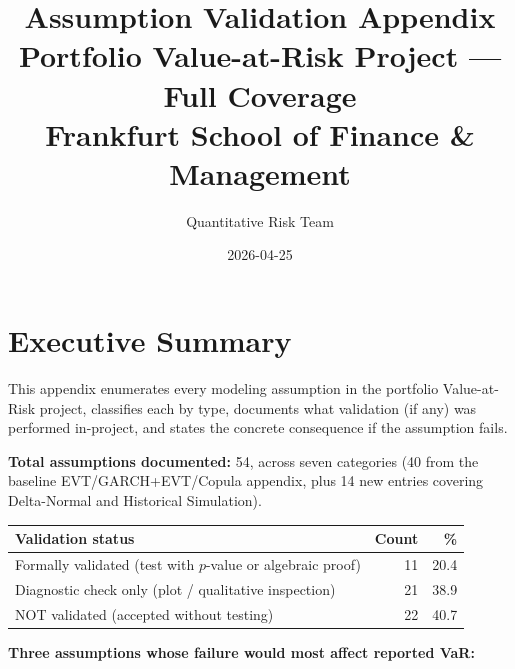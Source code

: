 \documentclass[11pt,a4paper]{article}
\title{Assumption Validation Appendix\\[0.5em]
\large Portfolio Value-at-Risk Project --- Full Coverage\\
\normalsize Frankfurt School of Finance \& Management}
\author{Quantitative Risk Team}
\date{2026-04-25}
\begin{document}
\maketitle
\tableofcontents
\newpage

\section{Executive Summary}\label{sec:executive-summary}

This appendix enumerates every modeling assumption in the portfolio
Value-at-Risk project, classifies each by type, documents what validation
(if any) was performed in-project, and states the concrete consequence if
the assumption fails.

\medskip
\noindent\textbf{Total assumptions documented:} 54, across seven categories
(40 from the baseline EVT/GARCH+EVT/Copula appendix, plus 14 new entries
covering Delta-Normal and Historical Simulation).

\medskip
\begin{tabular}{@{}lrr@{}}
\toprule
\textbf{Validation status} & \textbf{Count} & \textbf{\%} \\
\midrule
Formally validated (test with $p$-value or algebraic proof) & 11 & 20.4 \\
Diagnostic check only (plot / qualitative inspection)       & 21 & 38.9 \\
NOT validated (accepted without testing)                    & 22 & 40.7 \\
\bottomrule
\end{tabular}

\medskip
\noindent\textbf{Three assumptions whose failure would most affect reported VaR:}
\end{document}

